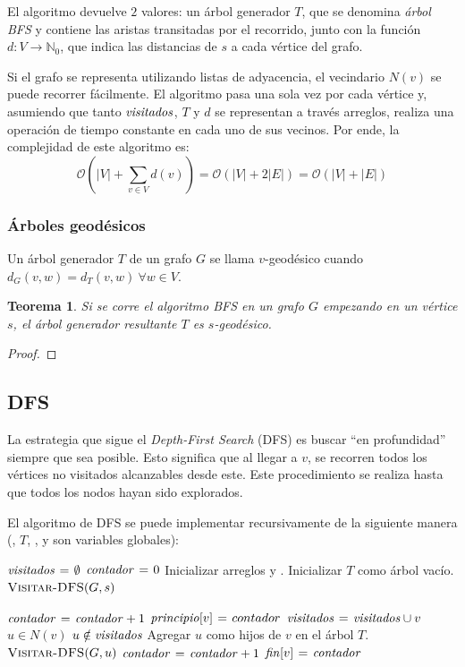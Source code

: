 \documentclass[a4paper]{report}
\newcommand{\BigO}[1]{\ensuremath{\mathcal{O}(#1)}}
\newcommand{\N}{\mathbb{N}}
\newcommand{\Each}{\kw{each}\ }
\newtheorem*{theorem*}{Teorema}
\begin{document}
El algoritmo devuelve $2$ valores: un árbol generador $T$, que se denomina \textit{árbol BFS} y contiene las aristas transitadas por el recorrido, junto con la función $d: V \longrightarrow \N_0$, que indica las distancias de $s$ a cada vértice del grafo.

Si el grafo se representa utilizando listas de adyacencia, el vecindario $N(v)$ se puede recorrer fácilmente. El algoritmo pasa una sola vez por cada vértice y, asumiendo que tanto $\id{visitados}$, $T$ y $d$ se representan a través arreglos, realiza una operación de tiempo constante en cada uno de sus vecinos. Por ende, la complejidad de este algoritmo es:
$$\BigO{|V| + \sum_{v \in V} d(v)} = \BigO{|V| + 2|E|} = \BigO{|V| + |E|}$$

\subsubsection{Árboles geodésicos}

Un árbol generador $T$ de un grafo $G$ se llama $v$-geodésico cuando $d_G(v, w) = d_T(v, w)\ \forall w \in V$.
\begin{theorem*}
    Si se corre el algoritmo BFS en un grafo $G$ empezando en un vértice $s$, el árbol generador resultante $T$ es $s$-geodésico.
\end{theorem*}
\begin{proof}
\end{proof}

\subsection{DFS}

La estrategia que sigue el \textit{Depth-First Search} (DFS) es buscar ``en profundidad'' siempre que sea posible. Esto significa que al llegar a $v$, se recorren todos los vértices no visitados alcanzables desde este. Este procedimiento se realiza hasta que todos los nodos hayan sido explorados.

El algoritmo de DFS se puede implementar recursivamente de la siguiente manera (, $T$, ,  y  son variables globales):

\begin{codebox}
    \li $\id{visitados} \gets \emptyset$
    \li $\id{contador} \gets 0$
    \li Inicializar arreglos  y .
    \li Inicializar $T$ como árbol vacío.
    \li $\textnormal{\scshape Visitar-DFS}(G, s)$
\end{codebox}
\label{dfs-visit}
\begin{codebox}
    \li $\id{contador} \gets \id{contador} + 1$
    \li $\id{principio}[v] \gets contador$
    \li $\id{visitados} \gets \id{visitados} \cup v$
    \li \For \Each $u \in N(v)$ \Do
    \li \If $u \notin \id{visitados}$
    \li Agregar $u$ como hijos de $v$ en el árbol $T$.
    \li $\textnormal{\scshape Visitar-DFS}(G, u)$
    \End
    \End
    \li $\id{contador} \gets \id{contador} + 1$
    \li $\id{fin}[v] \gets \id{contador}$
\end{codebox}
\end{document}
